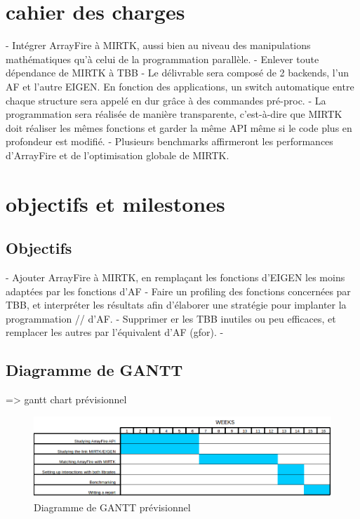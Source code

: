 \documentclass{report}
\begin{document}
	\section{cahier des charges}
	- Intégrer ArrayFire à MIRTK, aussi bien au niveau des manipulations mathématiques qu'à celui de la programmation parallèle.
	\newline- Enlever toute dépendance de MIRTK à TBB
	\newline- Le délivrable sera composé de 2 backends, l'un AF et l'autre EIGEN. En fonction des applications, un switch automatique entre chaque structure sera appelé en dur grâce à des commandes pré-proc.
	\newline- La programmation sera réalisée de manière transparente, c'est-à-dire que MIRTK doit réaliser les mêmes fonctions et garder la même API même si le code plus en profondeur est modifié.
	\newline- Plusieurs benchmarks affirmeront les performances d'ArrayFire et de l'optimisation globale de MIRTK.
	\section{objectifs et milestones}
	\subsection{Objectifs}- Ajouter ArrayFire à MIRTK, en remplaçant les fonctions d'EIGEN les moins adaptées par les fonctions d'AF
	- Faire un profiling des fonctions concernées par TBB, et interpréter les résultats afin d'élaborer une stratégie pour implanter la programmation // d'AF.
	- Supprimer er les TBB inutiles ou peu efficaces, et remplacer les autres par l'équivalent d'AF (gfor).
	- 
	
	\subsection{Diagramme de GANTT}
	 => gantt chart prévisionnel
	\begin{figure}[h!]
		\begin{center}
			\includegraphics[width=18cm]{Reports/figures/estimated_gantt.png}
		\end{center}	
		\caption{Diagramme de GANTT prévisionnel}
		\label{Diagramme de GANTT prévisionnel}
	\end{figure}
\end{document}
